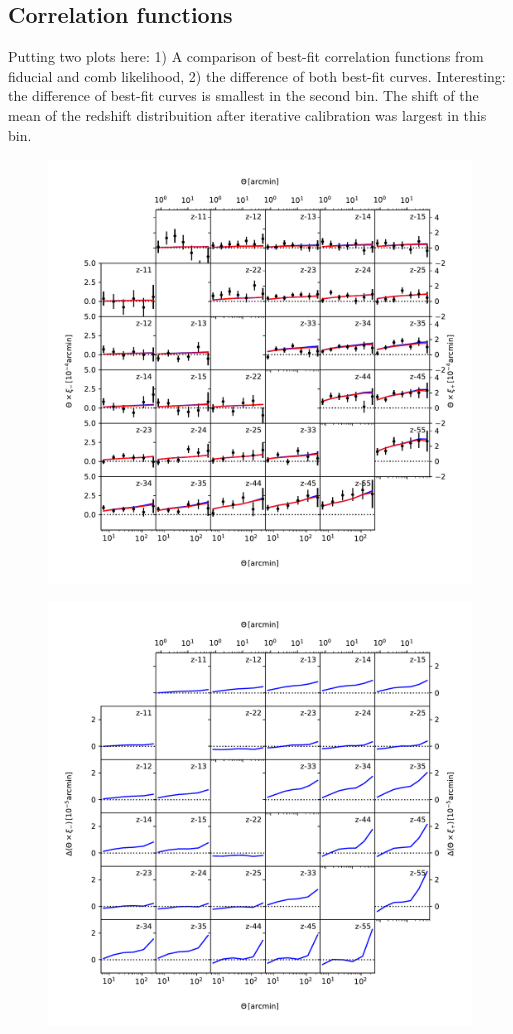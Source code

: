 \documentclass{aa}
\begin{document}
\begin{appendix}
\section{Correlation functions}
Putting two plots here: 1) A comparison of best-fit correlation functions from fiducial and comb likelihood, 2) the difference of both best-fit curves. Interesting: the difference of best-fit curves is smallest in the second bin. The shift of the mean of the redshift distribuition after iterative calibration was largest in this bin.
\begin{figure}
\centering
\includegraphics[width=\linewidth]{plots/correlation_functions.pdf}
\end{figure}
\begin{figure}
\centering
\includegraphics[width=\linewidth]{plots/correlation_functions_delta.pdf}

\end{figure}
\end{appendix}
\end{document}
